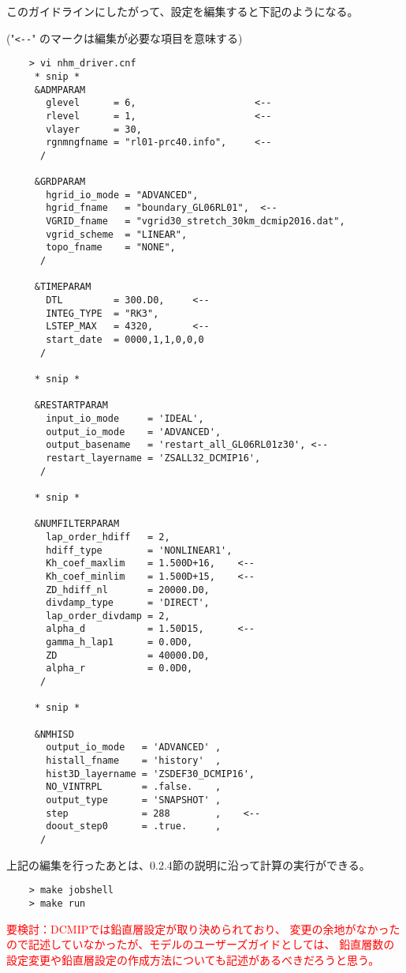  \noindent このガイドラインにしたがって、設定を編集すると下記のようになる。

 ("\verb|<--|" のマークは編集が必要な項目を意味する)
 \begin{verbatim}
    > vi nhm_driver.cnf
     * snip *
     &ADMPARAM
       glevel      = 6,                     <--
       rlevel      = 1,                     <--
       vlayer      = 30,
       rgnmngfname = "rl01-prc40.info",     <--
      /

     &GRDPARAM
       hgrid_io_mode = "ADVANCED",
       hgrid_fname   = "boundary_GL06RL01",  <--
       VGRID_fname   = "vgrid30_stretch_30km_dcmip2016.dat",
       vgrid_scheme  = "LINEAR",
       topo_fname    = "NONE",
      /

     &TIMEPARAM
       DTL         = 300.D0,     <--
       INTEG_TYPE  = "RK3",
       LSTEP_MAX   = 4320,       <--
       start_date  = 0000,1,1,0,0,0
      /

     * snip *

     &RESTARTPARAM
       input_io_mode     = 'IDEAL',
       output_io_mode    = 'ADVANCED',
       output_basename   = 'restart_all_GL06RL01z30', <--
       restart_layername = 'ZSALL32_DCMIP16',
      /

     * snip *

     &NUMFILTERPARAM
       lap_order_hdiff   = 2,
       hdiff_type        = 'NONLINEAR1',
       Kh_coef_maxlim    = 1.500D+16,    <--
       Kh_coef_minlim    = 1.500D+15,    <--
       ZD_hdiff_nl       = 20000.D0,
       divdamp_type      = 'DIRECT',
       lap_order_divdamp = 2,
       alpha_d           = 1.50D15,      <--
       gamma_h_lap1      = 0.0D0,
       ZD                = 40000.D0,
       alpha_r           = 0.0D0,
      /

     * snip *

     &NMHISD
       output_io_mode   = 'ADVANCED' ,
       histall_fname    = 'history'  ,
       hist3D_layername = 'ZSDEF30_DCMIP16',
       NO_VINTRPL       = .false.    ,
       output_type      = 'SNAPSHOT' ,
       step             = 288        ,    <--
       doout_step0      = .true.     ,
      /
 \end{verbatim}

 \noindent 上記の編集を行ったあとは、0.2.4節の説明に沿って計算の実行ができる。
 \begin{verbatim}
    > make jobshell
    > make run
 \end{verbatim}


\textcolor{red}{要検討：DCMIPでは鉛直層設定が取り決められており、
変更の余地がなかったので記述していなかったが、モデルのユーザーズガイドとしては、
鉛直層数の設定変更や鉛直層設定の作成方法についても記述があるべきだろうと思う。}
